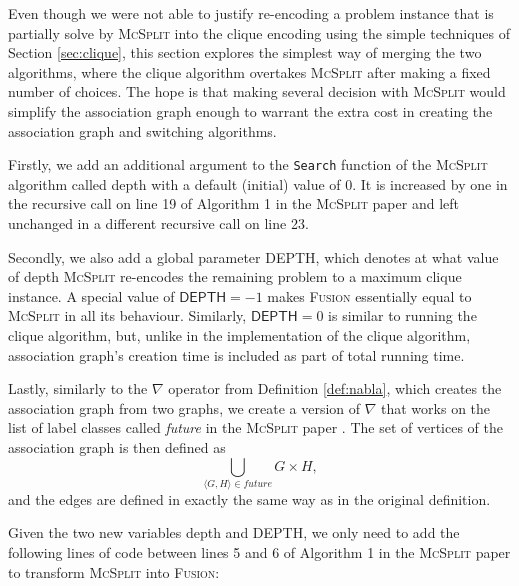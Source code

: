 \documentclass{l4proj}
\theoremstyle{definition}
\theoremstyle{remark}
\begin{document}
Even though we were not able to justify re-encoding a problem instance that is
partially solve by \textsc{McSplit} into the clique encoding using the simple
techniques of Section \ref{sec:clique}, this section explores the simplest way of
merging the two algorithms, where the clique algorithm overtakes
\textsc{McSplit} after making a fixed number of choices. The hope is that making
several decision with \textsc{McSplit} would simplify the association graph
enough to warrant the extra cost in creating the association graph and switching
algorithms.

Firstly, we add an additional argument to the \texttt{Search} function of the
\textsc{McSplit} algorithm \cite{DBLP:conf/ijcai/McCreeshPT17} called
\textsf{depth} with a default (initial) value of 0. It is increased by one in
the recursive call on line 19 of Algorithm 1 in the \textsc{McSplit} paper
\cite{DBLP:conf/ijcai/McCreeshPT17} and left unchanged in a different recursive
call on line 23.

Secondly, we also add a global parameter \textsf{DEPTH}, which denotes at what value of
\textsf{depth} \textsc{McSplit} re-encodes the remaining problem to a maximum
clique instance. A special value of $\textsf{DEPTH} = -1$ makes \textsc{Fusion}
essentially equal to \textsc{McSplit} in all its behaviour. Similarly,
$\textsf{DEPTH} = 0$ is similar to running the clique algorithm, but, unlike in
the implementation of the clique algorithm, association graph's creation time is
included as part of total running time.

Lastly, similarly to the $\nabla$ operator from Definition \ref{def:nabla},
which creates the association graph from two graphs, we create a version of
$\nabla$ that works on the list of label classes called \textit{future} in the
\textsc{McSplit} paper \cite{DBLP:conf/ijcai/McCreeshPT17}. The set of vertices
of the association graph is then defined as
\[ \bigcup_{\langle G, H \rangle \in \textit{future}} G \times H, \]
and the edges are defined in exactly the same way as in the original definition.

Given the two new variables \textsf{depth} and \textsf{DEPTH}, we only need to
add the following lines of code between lines 5 and 6 of Algorithm 1 in the
\textsc{McSplit} paper \cite{DBLP:conf/ijcai/McCreeshPT17} to transform
\textsc{McSplit} into \textsc{Fusion}:

\begin{algorithm}
\end{algorithm}
\end{document}
